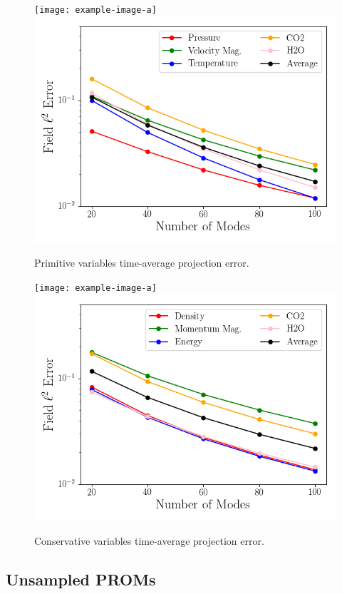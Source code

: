 \begin{figure}
	\begin{minipage}{0.48\linewidth}
		\ifdefined\DRAFT
			\texttt{[image: example-image-a]}
		\else
			\includegraphics[width=0.99\linewidth,trim={0.5em 0.5em 0.5em 0.5em},clip]{Chapters/HPROMResults/Images/nineElem/projection_error_primitive.png}
		\fi
		\caption{\label{fig:nineElemProjErrPrim}Primitive variables time-average projection error.}
	\end{minipage} \hspace{0.5em}
	\begin{minipage}{0.48\linewidth}
		\ifdefined\DRAFT
			\texttt{[image: example-image-a]}
		\else
			\includegraphics[width=0.99\linewidth,trim={0.5em 0.5em 0.5em 0.5em},clip]{Chapters/HPROMResults/Images/nineElem/projection_error_conservative.png}
		\fi
		\caption{\label{fig:nineElemProjErrCons}Conservative variables time-average projection error.}
	\end{minipage}
\end{figure}

\subsection{Unsampled PROMs}

